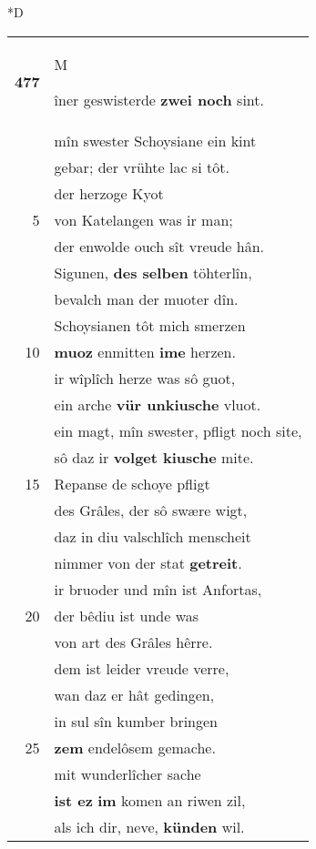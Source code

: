 \documentclass[8pt,a4paper,notitlepage]{article}
\begin{document}
\begin{table}[ht]
\begin{minipage}[t]{0.5\linewidth}
\small
\begin{center}*D
\end{center}
\begin{tabular}{rl}
\textbf{477} & \begin{large}M\end{large}îner geswisterde \textbf{zwei noch} sint.\\ 
 & mîn swester Schoysiane ein kint\\ 
 & gebar; der vrühte lac si tôt.\\ 
 & der herzoge Kyot\\ 
5 & von Katelangen was ir man;\\ 
 & der enwolde ouch sît vreude hân.\\ 
 & Sigunen, \textbf{des selben} töhterlîn,\\ 
 & bevalch man der muoter dîn.\\ 
 & Schoysianen tôt mich smerzen\\ 
10 & \textbf{muoz} enmitten \textbf{ime} herzen.\\ 
 & ir wîplîch herze was sô guot,\\ 
 & ein arche \textbf{vür unkiusche} vluot.\\ 
 & ein magt, mîn swester, pfligt noch site,\\ 
 & sô daz ir \textbf{volget kiusche} mite.\\ 
15 & Repanse de schoye pfligt\\ 
 & des Grâles, der sô swære wigt,\\ 
 & daz in diu valschlîch menscheit\\ 
 & nimmer von der stat \textbf{getreit}.\\ 
 & ir bruoder und mîn ist Anfortas,\\ 
20 & der bêdiu ist unde was\\ 
 & von art des Grâles hêrre.\\ 
 & dem ist leider vreude verre,\\ 
 & wan daz er hât gedingen,\\ 
 & in sul sîn kumber bringen\\ 
25 & \textbf{zem} endelôsem gemache.\\ 
 & mit wunderlîcher sache\\ 
 & \textbf{ist ez} \textbf{im} komen an riwen zil,\\ 
 & als ich dir, neve, \textbf{künden} wil.\\ 

\end{tabular}
\end{minipage}
\end{table}
\end{document}
